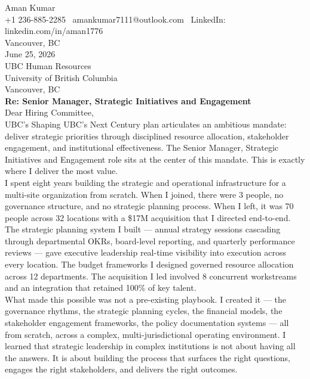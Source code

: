 \documentclass[11pt]{article}
\begin{document}
Aman Kumar \\
+1 236-885-2285 \textbar\ amankumar7111@outlook.com \textbar\ LinkedIn: linkedin.com/in/aman1776 \\
Vancouver, BC \\[12pt]

June 25, 2026 \\[12pt]

UBC Human Resources \\
University of British Columbia \\
Vancouver, BC \\[12pt]

\textbf{Re: Senior Manager, Strategic Initiatives and Engagement} \\[8pt]

Dear Hiring Committee, \\[8pt]

UBC's Shaping UBC's Next Century plan articulates an ambitious mandate: deliver strategic priorities through disciplined resource allocation, stakeholder engagement, and institutional effectiveness. The Senior Manager, Strategic Initiatives and Engagement role sits at the center of this mandate. This is exactly where I deliver the most value. \\[8pt]

I spent eight years building the strategic and operational infrastructure for a multi-site organization from scratch. When I joined, there were 3 people, no governance structure, and no strategic planning process. When I left, it was 70 people across 32 locations with a \$17M acquisition that I directed end-to-end. The strategic planning system I built --- annual strategy sessions cascading through departmental OKRs, board-level reporting, and quarterly performance reviews --- gave executive leadership real-time visibility into execution across every location. The budget frameworks I designed governed resource allocation across 12 departments. The acquisition I led involved 8 concurrent workstreams and an integration that retained 100\% of key talent. \\[8pt]

What made this possible was not a pre-existing playbook. I created it --- the governance rhythms, the strategic planning cycles, the financial models, the stakeholder engagement frameworks, the policy documentation systems --- all from scratch, across a complex, multi-jurisdictional operating environment. I learned that strategic leadership in complex institutions is not about having all the answers. It is about building the process that surfaces the right questions, engages the right stakeholders, and delivers the right outcomes. \\[8pt]
\end{document}
